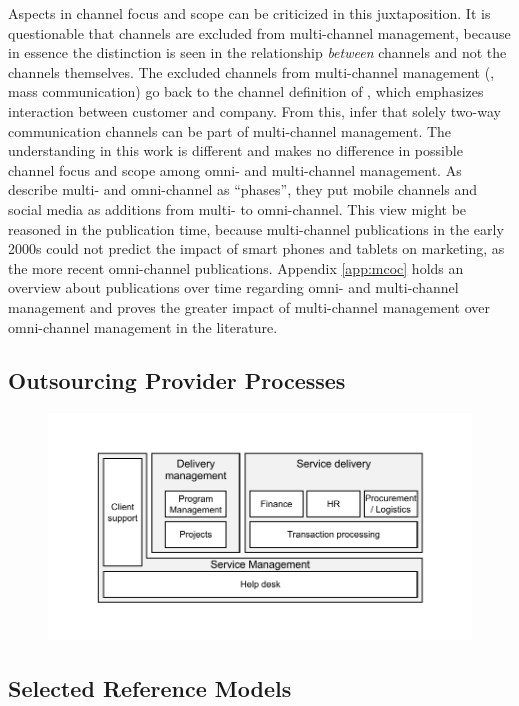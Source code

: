 Aspects in channel focus and scope can be criticized in this juxtaposition. It is questionable that channels are excluded from multi-channel management, because in essence the distinction is seen in the relationship \textit{between} channels and not the channels themselves. The excluded channels from multi-channel management (\viz, mass communication) go back to the channel definition of \cite{Neslin2006}, which emphasizes interaction between customer and company. From this, \citeauthor{vorhoef2015retail} infer that solely two-way communication channels can be part of multi-channel management. The understanding in this work is different and makes no difference in possible channel focus and scope among omni- and multi-channel management. As \citeauthor{vorhoef2015retail} describe multi- and omni-channel as \enquote{phases}, they put mobile channels and social media as additions from multi- to omni-channel. This view might be reasoned in the publication time, because multi-channel publications in the early 2000s could not predict the impact of smart phones and tablets on marketing, as the more recent omni-channel publications. Appendix \ref{app:mcoc} holds an overview about publications over time regarding omni- and multi-channel management and proves the greater impact of multi-channel management over omni-channel management in the literature. 


\subsection{Outsourcing Provider Processes}
\label{app:provproc}

		\begin{figure}[caption={Outsourcing Provider Processes}, label={fig:scheweproc}]
	{	\includegraphics[width=.8\textwidth]{figures/scheweproc.pdf}\\
		 } 
\end{figure}
\subsection{Selected Reference Models}

